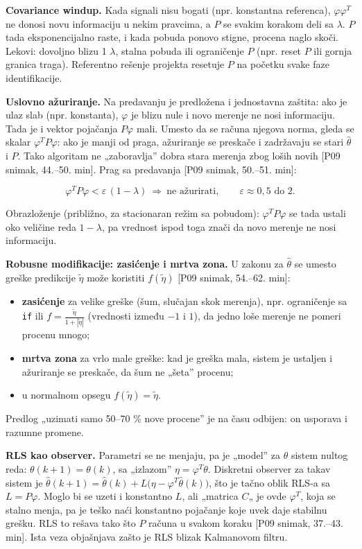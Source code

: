 \documentclass[11pt,a4paper,parskip=half,headsepline,numbers=noenddot]{scrartcl}
\DeclareRobustCommand{\izvor}[1]{{\small\color{izvorC}[#1]}}
\begin{document}
\textbf{Covariance windup.} Kada signali nisu bogati (npr. konstantna referenca), \(\varphi\varphi^T\) ne donosi novu informaciju u nekim pravcima, a \(P\) se svakim korakom deli sa \(\lambda\). \(P\) tada eksponencijalno raste, i kada pobuda ponovo stigne, procena naglo skoči. Lekovi: dovoljno blizu 1 \(\lambda\), stalna pobuda ili ograničenje \(P\) (npr. reset \(P\) ili gornja granica traga). Referentno rešenje projekta resetuje \(P\) na početku svake faze identifikacije.

\textbf{Uslovno ažuriranje.} Na predavanju je predložena i jednostavna zaštita: ako je ulaz slab (npr. konstanta), \(\varphi\) je blizu nule i novo merenje ne nosi informaciju. Tada je i vektor pojačanja \(P\varphi\) mali. Umesto da se računa njegova norma, gleda se skalar \(\varphi^TP\varphi\): ako je manji od praga, ažuriranje se preskače i zadržavaju se stari \(\hat\theta\) i \(P\). Tako algoritam ne „zaboravlja'' dobra stara merenja zbog loših novih \izvor{P09 snimak, 44.--50. min}. Prag sa predavanja \izvor{P09 snimak, 50.--51. min}:

\[\varphi^TP\varphi < \varepsilon\,(1 - \lambda)\ \Rightarrow\ \text{ne ažurirati},\qquad \varepsilon \approx 0{,}5 \text{ do } 2 .\]

Obrazloženje (približno, za stacionaran režim sa pobudom): \(\varphi^TP\varphi\) se tada ustali oko veličine reda \(1 - \lambda\), pa vrednost ispod toga znači da novo merenje ne nosi informaciju.

\textbf{Robusne modifikacije: zasićenje i mrtva zona.} U zakonu za \(\hat\theta\) se umesto greške predikcije \(\tilde\eta\) može koristiti \(f(\tilde\eta)\) \izvor{P09 snimak, 54.--62. min}:

\begin{itemize}
\item \textbf{zasićenje} za velike greške (šum, slučajan skok merenja), npr. ograničenje sa \texttt{if} ili \(f = \frac{\tilde\eta}{1 + |\tilde\eta|}\) (vrednosti između \(-1\) i \(1\)), da jedno loše merenje ne pomeri procenu mnogo;
\item \textbf{mrtva zona} za vrlo male greške: kad je greška mala, sistem je ustaljen i ažuriranje se preskače, da šum ne „šeta'' procenu;
\item u normalnom opsegu \(f(\tilde\eta) = \tilde\eta\).
\end{itemize}

Predlog „uzimati samo 50--70 \% nove procene'' je na času odbijen: on usporava i razumne promene.

\textbf{RLS kao observer.} Parametri se ne menjaju, pa je „model'' za \(\theta\) sistem nultog reda: \(\theta(k+1) = \theta(k)\), sa „izlazom'' \(\eta = \varphi^T\theta\). Diskretni observer za takav sistem je \(\hat\theta(k+1) = \hat\theta(k) + L\big(\eta - \varphi^T\hat\theta(k)\big)\), što je tačno oblik RLS-a sa \(L = P\varphi\). Moglo bi se uzeti i konstantno \(L\), ali „matrica \(C\)„ je ovde \(\varphi^T\), koja se stalno menja, pa je teško naći konstantno pojačanje koje uvek daje stabilnu grešku. RLS to rešava tako što \(P\) računa u svakom koraku \izvor{P09 snimak, 37.--43. min}. Ista veza objašnjava zašto je RLS blizak Kalmanovom filtru.
\end{document}
